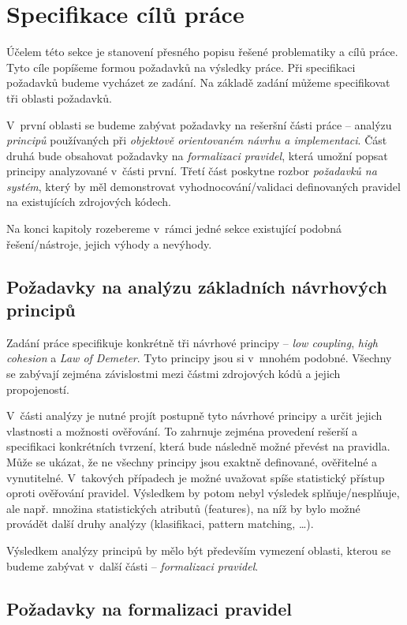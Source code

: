 \chapter{Specifikace cílů práce}

Účelem této sekce je stanovení přesného popisu řešené problematiky a cílů práce. Tyto cíle popíšeme formou požadavků na výsledky práce. Při specifikaci požadavků budeme vycházet ze zadání. Na základě zadání můžeme specifikovat tři oblasti požadavků.

V~první oblasti se budeme zabývat požadavky na rešeršní části práce -- analýzu \emph{principů} používaných při \emph{objektově orientovaném návrhu a implementaci}. Část druhá bude obsahovat požadavky na \emph{formalizaci pravidel}, která umožní popsat principy analyzované v~části první. Třetí část poskytne rozbor \emph{požadavků na systém}, který by měl demonstrovat vyhodnocování/validaci definovaných pravidel na existujících zdrojových kódech.

Na konci kapitoly rozebereme v~rámci jedné sekce existující podobná řešení/nástroje, jejich výhody a nevýhody.

\section{Požadavky na analýzu základních návrhových principů}
\label{requirements-principle_analysis}
Zadání práce specifikuje konkrétně tři návrhové principy -- \emph{low coupling}, \emph{high cohesion} a \emph{Law of Demeter}. Tyto principy jsou si v~mnohém podobné. Všechny se zabývají zejména závislostmi mezi částmi zdrojových kódů a jejich propojeností.

V~části analýzy je nutné projít postupně tyto návrhové principy a určit jejich vlastnosti a možnosti ověřování. To zahrnuje zejména provedení rešerší a specifikaci konkrétních tvrzení, která bude následně možné převést na pravidla. Může se ukázat, že ne všechny principy jsou exaktně definované, ověřitelné a vynutitelné. V~takových případech je možné uvažovat spíše statistický přístup oproti ověřování pravidel. Výsledkem by potom nebyl výsledek splňuje/nesplňuje, ale např. množina statistických atributů (features), na níž by bylo možné provádět další druhy analýzy (klasifikaci, pattern matching, \ldots).

Výsledkem analýzy principů by mělo být především vymezení oblasti, kterou se budeme zabývat v~další části -- \emph{formalizaci pravidel}.

\section{Požadavky na formalizaci pravidel}

